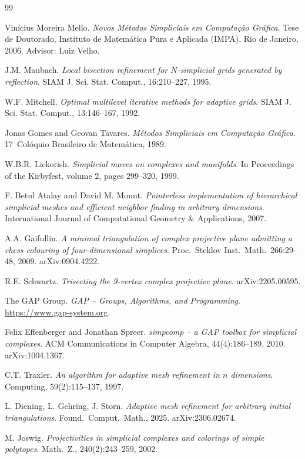 \documentclass[11pt]{article}
\begin{document}
\begin{thebibliography}{99}

Vinícius Moreira Mello.
\emph{Novos Métodos Simpliciais em Computação Gráfica}.
Tese de Doutorado, Instituto de Matemática Pura e Aplicada (IMPA), Rio de
Janeiro, 2006. Advisor: Luiz Velho.

J.M. Maubach.
\emph{Local bisection refinement for $N$-simplicial grids generated by
reflection}.
SIAM J. Sci. Stat. Comput., 16:210--227, 1995.

W.F. Mitchell.
\emph{Optimal multilevel iterative methods for adaptive grids}.
SIAM J. Sci. Stat. Comput., 13:146--167, 1992.

Jonas Gomes and Geovan Tavares.
\emph{Métodos Simpliciais em Computação Gráfica}.
17\textordmasculine\ Colóquio Brasileiro de Matemática, 1989.

W.B.R. Lickorish.
\emph{Simplicial moves on complexes and manifolds}.
In Proceedings of the Kirbyfest, volume 2, pages 299--320, 1999.

F. Betul Atalay and David M. Mount.
\emph{Pointerless implementation of hierarchical simplicial meshes and
efficient neighbor finding in arbitrary dimensions}.
International Journal of Computational Geometry \& Applications, 2007.

A.A. Gaifullin.
\emph{A minimal triangulation of complex projective plane admitting a
chess colouring of four-dimensional simplices}.
Proc.\ Steklov Inst.\ Math.\ 266:29--48, 2009. arXiv:0904.4222.

R.E. Schwartz.
\emph{Trisecting the 9-vertex complex projective plane}.
arXiv:2205.00595.

The GAP Group.
\emph{GAP -- Groups, Algorithms, and Programming}.
\url{https://www.gap-system.org}.

Felix Effenberger and Jonathan Spreer.
\emph{simpcomp -- a GAP toolbox for simplicial complexes}.
ACM Communications in Computer Algebra, 44(4):186--189, 2010.
arXiv:1004.1367.

C.T. Traxler.
\emph{An algorithm for adaptive mesh refinement in $n$ dimensions}.
Computing, 59(2):115--137, 1997.

L. Diening, L. Gehring, J. Storn.
\emph{Adaptive mesh refinement for arbitrary initial triangulations}.
Found.\ Comput.\ Math., 2025. arXiv:2306.02674.

M. Joswig.
\emph{Projectivities in simplicial complexes and colorings of simple
polytopes}. Math.\ Z., 240(2):243--259, 2002.

\end{thebibliography}
\end{document}
